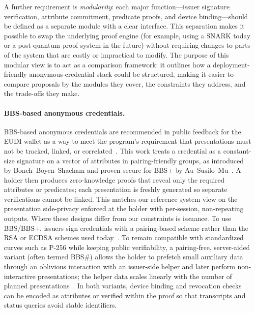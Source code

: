 A further requirement is \emph{modularity}: each major function---issuer signature verification, attribute commitment, predicate proofs, and device binding---should be defined as a separate module with a clear interface. This separation makes it possible to swap the underlying proof engine (for example, using a SNARK today or a post-quantum proof system in the future) without requiring changes to parts of the system that are costly or impractical to modify. The purpose of this modular view is to act as a comparison framework: it outlines how a deployment-friendly anonymous-credential stack could be structured, making it easier to compare proposals by the modules they cover, the constraints they address, and the trade-offs they make.

\paragraph{BBS-based anonymous credentials.~\cite{baum2024cryptographers}}
BBS-based anonymous credentials are recommended in public feedback for the EUDI wallet as a way to meet the program’s requirement that presentations must not be tracked, linked, or correlated~\cite{baum2024cryptographers}.
This work treats a credential as a constant-size signature on a vector of attributes in pairing-friendly groups, as introduced by Boneh–Boyen–Shacham and proven secure for BBS+ by Au–Susilo–Mu~\cite{C:BonBoySha04,SCN:AuSusMu06}.
A holder then produces zero-knowledge proofs that reveal only the required attributes or predicates; each presentation is freshly generated so separate verifications cannot be linked.
This matches our reference system view on the presentation side-privacy enforced at the holder with per-session, non-repeating outputs.
Where these designs differ from our constraints is issuance. To use BBS/BBS+, issuers sign credentials with a pairing-based scheme rather than the RSA or ECDSA schemes used today~\cite{C:BonBoySha04,SCN:AuSusMu06}. To remain compatible with standardized curves such as P-256 while keeping public verifiability, a pairing-free, server-aided variant (often termed BBS\#) allows the holder to prefetch small auxiliary data through an oblivious interaction with an issuer-side helper and later perform non-interactive presentations; the helper data scales linearly with the number of planned presentations~\cite{cryptoeprint:2025/513}.
In both variants, device binding and revocation checks can be encoded as attributes or verified within the proof so that transcripts and status queries avoid stable identifiers.


